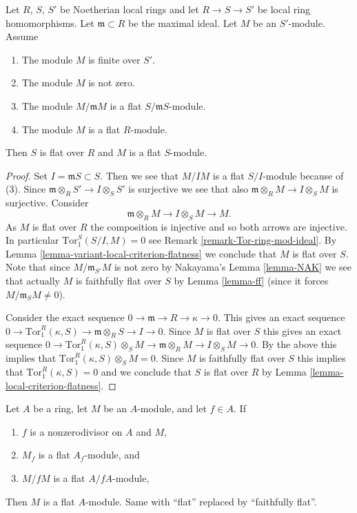 \begin{lemma}
\label{lemma-criterion-flatness-fibre-Noetherian}
Let $R$, $S$, $S'$ be Noetherian local rings and let $R \to S \to S'$
be local ring homomorphisms. Let $\mathfrak m \subset R$ be the
maximal ideal. Let $M$ be an $S'$-module. Assume
\begin{enumerate}
\item The module $M$ is finite over $S'$.
\item The module $M$ is not zero.
\item The module $M/\mathfrak m M$
is a flat $S/\mathfrak m S$-module.
\item The module $M$ is a flat $R$-module.
\end{enumerate}
Then $S$ is flat over $R$ and $M$ is a flat $S$-module.
\end{lemma}

\begin{proof}
Set $I = \mathfrak mS \subset S$. Then we see that $M/IM$ is a flat
$S/I$-module because of (3). Since
$\mathfrak m \otimes_R S' \to I \otimes_S S'$ is surjective we see
that also $\mathfrak m \otimes_R M \to I \otimes_S M$ is surjective.
Consider
$$
\mathfrak m \otimes_R M \to I \otimes_S M \to M.
$$
As $M$ is flat over $R$ the composition is injective
and so both arrows are injective.
In particular $\text{Tor}_1^S(S/I, M) = 0$ see
Remark \ref{remark-Tor-ring-mod-ideal}. By
Lemma \ref{lemma-variant-local-criterion-flatness} we conclude
that $M$ is flat over $S$. Note that since $M/\mathfrak m_{S'}M$
is not zero by Nakayama's Lemma \ref{lemma-NAK}
we see that actually $M$ is faithfully flat over $S$ by
Lemma \ref{lemma-ff} (since it forces $M/\mathfrak m_SM \not = 0$).

\medskip\noindent
Consider the exact sequence
$0 \to \mathfrak m \to R \to \kappa \to 0$.
This gives an exact sequence
$0 \to \text{Tor}_1^R(\kappa, S) \to \mathfrak m \otimes_R S \to I \to 0$.
Since $M$ is flat over $S$ this gives an exact sequence
$0 \to \text{Tor}_1^R(\kappa, S)\otimes_S M \to
\mathfrak m \otimes_R M \to I \otimes_S M \to 0$.
By the above this implies that $\text{Tor}_1^R(\kappa, S)\otimes_S M = 0$.
Since $M$ is faithfully flat over $S$ this implies that
$\text{Tor}_1^R(\kappa, S) = 0$ and we conclude that
$S$ is flat over $R$ by Lemma \ref{lemma-local-criterion-flatness}.
\end{proof}

\begin{lemma}
\label{lemma-flatness-scallop}
Let $A$ be a ring, let $M$ be an $A$-module, and let $f \in A$. If
\begin{enumerate}
\item $f$ is a nonzerodivisor on $A$ and $M$,
\item $M_f$ is a flat $A_f$-module, and
\item $M/fM$ is a flat $A/fA$-module,
\end{enumerate}
Then $M$ is a flat $A$-module. Same with ``flat'' replaced by
``faithfully flat''.
\end{lemma}


